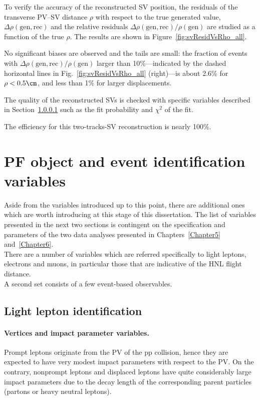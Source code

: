 To verify the accuracy of the reconstructed SV position, the residuals of the
transverse PV--SV distance $\rho$ with respect to the true generated
value, $\Delta\rho(\mathrm{gen,rec})$ and the relative residuals
$\Delta\rho(\mathrm{gen,rec})/\rho(\mathrm{gen})$ are studied as a
function of the true $\rho$. The results are shown in
Figure~\ref{fig:svResidVsRho_all}.

No significant biases are observed and
the tails are small: the fraction of events with
$\Delta\rho(\mathrm{gen,rec})/\rho(\mathrm{gen})$ larger than
10\%---indicated by the dashed horizontal lines in
Fig.~\ref{fig:svResidVsRho_all} (right)---is about 2.6\% for $\rho<0.5\cm$, and less than 1\% for larger
displacements.

The quality of the reconstructed SVs is checked with specific
variables described in Section~\ref{sec:c2IP} such as the fit
probability and $\chi^2$ of the fit. 

The efficiency for this two-tracks-SV reconstruction is nearly 100\%.


\section{PF object and event identification
  variables}\label{sec:c2variables}
Aside from the variables introduced up to this point, there are additional
ones which are worth introducing at this stage of this dissertation. 
The list of variables presented in the next two sections is
contingent on the specification and parameters of the two data analyses presented in Chapters~\ref{Chapter5}
and~\ref{Chapter6}.\\
There are a number of variables which are referred specifically to light
leptons, electrons and muons, in particular those that are indicative
of the HNL flight distance.\\
A second set consists of a few event-based observables. 



\subsection*{Light lepton
  identification} \label{sec:c2leptonvariables}

\paragraph{Vertices and impact parameter variables.} \label{sec:c2IP}
Prompt leptons originate from the PV of the pp collision, hence they
are expected to have very modest impact parameters with respect to the
PV. On the contrary, nonprompt leptons and displaced leptons have
quite considerably large impact parameters due to the decay length of the
corresponding parent particles (partons or heavy neutral leptons).

